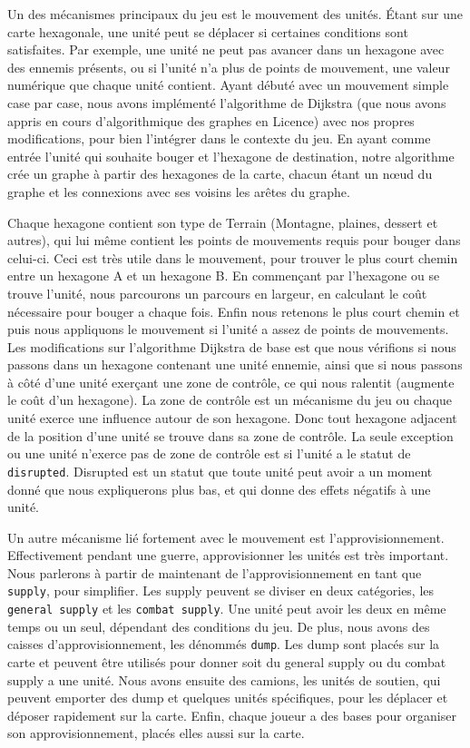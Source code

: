 Un des mécanismes principaux du jeu est le mouvement des unités.
Étant sur une carte hexagonale, une unité peut se déplacer si certaines conditions sont satisfaites.
Par exemple, une unité ne peut pas avancer dans un hexagone avec des ennemis présents, ou si l'unité n'a plus de
points de mouvement, une valeur numérique que chaque unité contient. Ayant débuté avec un mouvement simple case
par case, nous avons implémenté l'algorithme de Dijkstra (que nous avons appris en cours d'algorithmique des graphes en Licence) 
avec nos propres modifications, pour bien l'intégrer dans
le contexte du jeu. En ayant comme entrée l'unité qui souhaite bouger et l'hexagone de destination, notre algorithme
crée un graphe à partir des hexagones de la carte, chacun étant un nœud du graphe et les connexions avec ses voisins
les arêtes du graphe.

Chaque hexagone contient son type de Terrain (Montagne, plaines, dessert et autres), qui lui même contient les points
de mouvements requis pour bouger dans celui-ci. Ceci est très utile dans le mouvement, pour trouver le plus court
chemin entre un hexagone A et un hexagone B. En commençant par l'hexagone ou se trouve l'unité, nous parcourons un
parcours en largeur, en calculant le coût nécessaire pour bouger a chaque fois. Enfin nous retenons le plus court
chemin et puis nous appliquons le mouvement si l'unité a assez de points de mouvements. Les modifications sur
l'algorithme Dijkstra de base est que nous vérifions si nous passons dans un hexagone contenant une unité ennemie,
ainsi que si nous passons à côté d'une unité exerçant une zone de contrôle, ce qui nous ralentit (augmente le coût
d'un hexagone). La zone de contrôle est un mécanisme du jeu ou chaque unité exerce une influence autour de son
hexagone. Donc tout hexagone adjacent de la position d'une unité se trouve dans sa zone de contrôle.
La seule exception ou une unité n'exerce pas de zone de contrôle est si l'unité a le statut de {\tt disrupted}.
Disrupted est un statut que toute unité peut avoir a un moment donné que nous expliquerons plus bas, et qui donne
des effets négatifs à une unité.

Un autre mécanisme lié fortement avec le mouvement est l'approvisionnement. Effectivement pendant une guerre,
approvisionner les unités est très important. Nous parlerons à partir de maintenant de l'approvisionnement en
tant que {\tt supply}, pour simplifier. Les supply peuvent se diviser en deux catégories, les {\tt general supply} et les
{\tt combat supply}. Une unité peut avoir les deux en même temps ou un seul, dépendant des conditions du jeu. De plus,
nous avons des caisses d'approvisionnement, les dénommés {\tt dump}. Les dump sont placés sur la carte et peuvent
être utilisés pour donner soit du general supply ou du combat supply a une unité. Nous avons ensuite des camions,
les unités de soutien, qui peuvent emporter des dump et quelques unités spécifiques, pour les déplacer et déposer
rapidement sur la carte. Enfin, chaque joueur a des bases pour organiser son approvisionnement, placés elles aussi
sur la carte.


